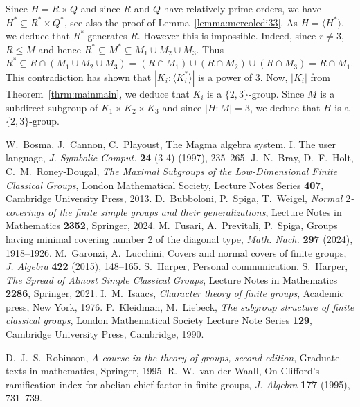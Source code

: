 \documentclass{amsart}
\begin{document}
Since $H=R\times Q$ and since $R$ and $Q$ have relatively prime orders, we have $H^\ast\subseteq R^\ast\times Q^\ast$, see also the proof of Lemma~\ref{lemma:mercoledi33}. As $H=\langle H^\ast\rangle$, we deduce that $R^\ast$ generates $R$. However this is impossible. Indeed, since $r\ne 3$, $R\le M$ and hence $R^\ast\subseteq M^\ast\subseteq M_1\cup M_2\cup M_3$. Thus $R^\ast\subseteq R\cap (M_1\cup M_2\cup M_3)=(R\cap M_1)\cup (R\cap M_2)\cup (R\cap M_3)=R\cap M_1$. This contradiction has shown that $|K_i:\langle K_i^\ast\rangle|$ is a power of $3$. Now, $|K_i|$ from Theorem~\ref{thrm:mainmain}, we deduce that $K_i$ is a $\{2,3\}$-group. Since $M$ is a subdirect subgroup of $K_1\times K_2\times K_3$ and since $|H:M|=3$, we deduce that $H$ is a $\{2,3\}$-group.



 W.~Bosma, J.~Cannon, C.~Playoust, 
The Magma algebra system. I. The user language, 
\textit{J. Symbolic Comput.} \textbf{24} (3-4) (1997), 235--265.
J.~N.~Bray, D.~F.~Holt, C.~M.~Roney-Dougal, \textit{The Maximal Subgroups of the Low-Dimensional Finite Classical Groups}, London Mathematical Society, Lecture Notes Series \textbf{407}, Cambridge University Press, 2013.
D.~Bubboloni, P.~Spiga, T.~Weigel, \textit{Normal $2$-coverings of the finite simple groups and their generalizations}, Lecture Notes in Mathematics \textbf{2352}, Springer, 2024.
M.~Fusari, A.~Previtali, P.~Spiga, Groups having minimal covering number 2 of the diagonal type, \textit{Math. Nach.} \textbf{297} (2024), 1918--1926. %
M.~Garonzi, A.~Lucchini,
Covers and normal covers of finite groups, \textit{J. Algebra} \textbf{422} (2015), 148--165.%
S.~Harper, Personal communication.
S.~Harper, \textit{The Spread of Almost Simple Classical Groups}, Lecture Notes in Mathematics \textbf{2286}, Springer, 2021.%
I.~M.~Isaacs, \textit{Character theory of finite groups}, Academic press, New York, 1976.
P.~Kleidman, M.~Liebeck, \textit{The subgroup structure of finite classical groups}, London Mathematical Society Lecture Note Series \textbf{129}, Cambridge University Press, Cambridge, 1990.

D.~J.~S.~Robinson, \textit{A course in the theory of groups, second edition}, Graduate texts in mathematics, Springer, 1995. 
R.~W.~van der Waall, On Clifford's ramification index for abelian chief factor in finite groups, \textit{J. Algebra} \textbf{177} (1995), 731--739.
\end{document}
